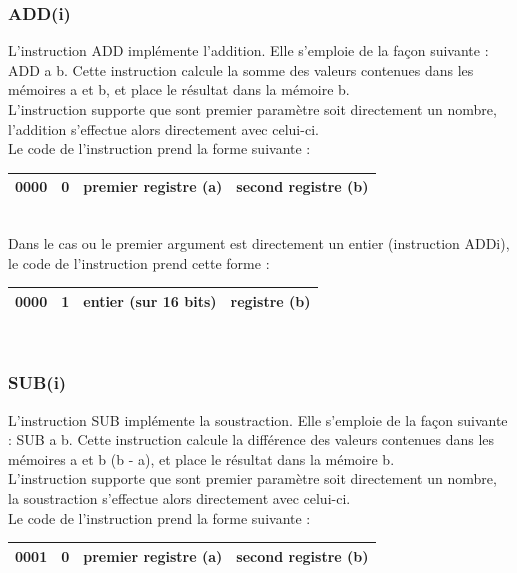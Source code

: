 \documentclass[a4paper, 12pt, twoside]{report}
\begin{document}
\subsubsection{ADD(i)}

L'instruction ADD implémente l'addition. Elle s'emploie de la façon suivante :
ADD a b. Cette instruction calcule la somme des valeurs contenues dans les mémoires
a et b, et place le résultat dans la mémoire b.\\
L'instruction supporte que sont premier paramètre soit directement un nombre, l'addition
s'effectue alors directement avec celui-ci.\\

Le code de l'instruction prend la forme suivante :

\begin{tabular}{|c|c|c|c|}
  \hline
  0000 & 0 & premier registre (a) & second registre (b) \\
  \hline
\end{tabular}\\

Dans le cas ou le premier argument est directement un entier (instruction ADDi),
le code de l'instruction prend cette forme :

\begin{tabular}{|c|c|c|c|}
  \hline
  0000 & 1 & entier (sur 16 bits) & registre (b) \\
  \hline
\end{tabular}\\

\subsubsection{SUB(i)}

L'instruction SUB implémente la soustraction. Elle s'emploie de la façon suivante :
SUB a b. Cette instruction calcule la différence des valeurs contenues dans les mémoires
a et b (b - a), et place le résultat dans la mémoire b.\\
L'instruction supporte que sont premier paramètre soit directement un nombre, la soustraction
s'effectue alors directement avec celui-ci.\\

Le code de l'instruction prend la forme suivante :

\begin{tabular}{|c|c|c|c|}
  \hline
  0001 & 0 & premier registre (a) & second registre (b) \\
  \hline
\end{tabular}\\
\end{document}
